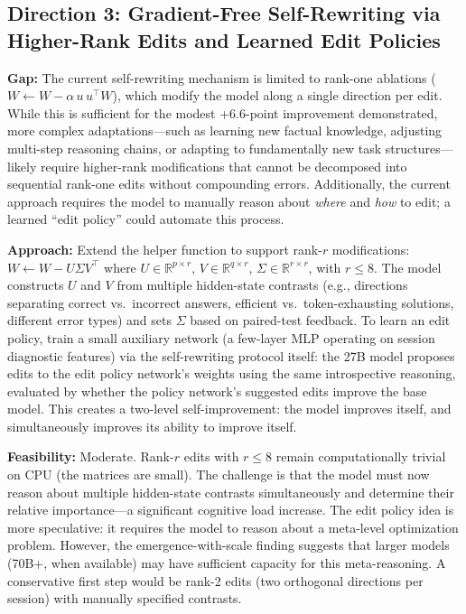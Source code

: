 \documentclass[11pt,a4paper]{article}
\begin{document}
\subsection{Direction 3: Gradient-Free Self-Rewriting via Higher-Rank Edits and Learned Edit Policies}
\textbf{Gap:} The current self-rewriting mechanism is limited to rank-one ablations ($W \leftarrow W - \alpha\, u\, u^\top W$), which modify the model along a single direction per edit. While this is sufficient for the modest +6.6-point improvement demonstrated, more complex adaptations---such as learning new factual knowledge, adjusting multi-step reasoning chains, or adapting to fundamentally new task structures---likely require higher-rank modifications that cannot be decomposed into sequential rank-one edits without compounding errors. Additionally, the current approach requires the model to manually reason about \emph{where} and \emph{how} to edit; a learned ``edit policy'' could automate this process.

\textbf{Approach:} Extend the helper function to support rank-$r$ modifications: $W \leftarrow W - U \Sigma V^\top$ where $U \in \mathbb{R}^{p \times r}$, $V \in \mathbb{R}^{q \times r}$, $\Sigma \in \mathbb{R}^{r \times r}$, with $r \leq 8$. The model constructs $U$ and $V$ from multiple hidden-state contrasts (e.g., directions separating correct vs.\ incorrect answers, efficient vs.\ token-exhausting solutions, different error types) and sets $\Sigma$ based on paired-test feedback. To learn an edit policy, train a small auxiliary network (a few-layer MLP operating on session diagnostic features) via the self-rewriting protocol itself: the 27B model proposes edits to the edit policy network's weights using the same introspective reasoning, evaluated by whether the policy network's suggested edits improve the base model. This creates a two-level self-improvement: the model improves itself, and simultaneously improves its ability to improve itself.

\textbf{Feasibility:} Moderate. Rank-$r$ edits with $r \leq 8$ remain computationally trivial on CPU (the matrices are small). The challenge is that the model must now reason about multiple hidden-state contrasts simultaneously and determine their relative importance---a significant cognitive load increase. The edit policy idea is more speculative: it requires the model to reason about a meta-level optimization problem. However, the emergence-with-scale finding suggests that larger models (70B+, when available) may have sufficient capacity for this meta-reasoning. A conservative first step would be rank-2 edits (two orthogonal directions per session) with manually specified contrasts.
\end{document}
